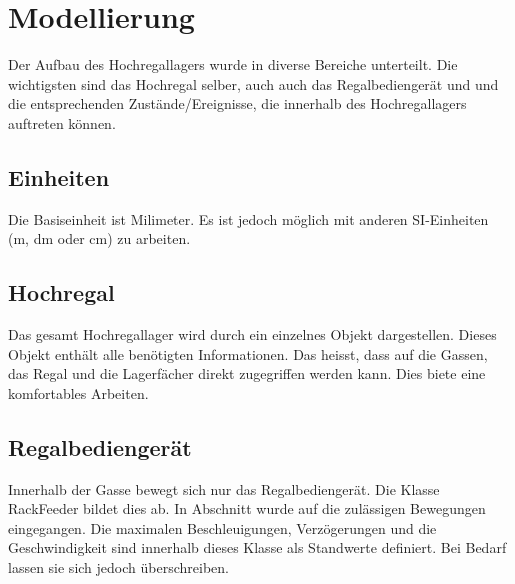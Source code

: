 \section{Modellierung}
Der Aufbau des Hochregallagers wurde in diverse Bereiche unterteilt. Die wichtigsten sind das Hochregal selber, auch auch das Regalbediengerät und und die entsprechenden Zustände/Ereignisse, die innerhalb des Hochregallagers auftreten können. 
%
\subsection{Einheiten}
Die Basiseinheit ist Milimeter. Es ist jedoch möglich mit anderen SI-Einheiten (m, dm oder cm) zu arbeiten.
%
\subsection{Hochregal}
Das gesamt Hochregallager wird durch ein einzelnes Objekt dargestellen. Dieses Objekt enthält alle benötigten Informationen. Das heisst, dass auf die Gassen, das Regal und die Lagerfächer direkt zugegriffen werden kann. Dies biete eine komfortables Arbeiten. 

%
\subsection{Regalbediengerät}
Innerhalb der Gasse bewegt sich nur das Regalbediengerät. Die Klasse RackFeeder bildet dies ab. In Abschnitt wurde auf die zulässigen Bewegungen eingegangen. Die maximalen Beschleuigungen, Verzögerungen und die Geschwindigkeit sind innerhalb dieses Klasse als Standwerte definiert. Bei Bedarf lassen sie sich jedoch überschreiben.
%
